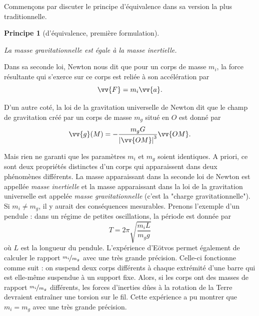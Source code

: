 \documentclass[a4paper,11pt]{report}
\theoremstyle{definition}
\theoremstyle{plain}
\newtheorem{prin}[thm]{Principe}
\theoremstyle{definition}
\theoremstyle{remark}
\begin{document}
            Commençons par discuter le principe d'équivalence dans sa version la plus traditionnelle.
            
            \begin{prin}[d'équivalence, première formulation]
            \begin{leftbar}
                La masse gravitationnelle est égale à la masse inertielle.
            \end{leftbar}
            \end{prin}
            
            Dans sa seconde loi, Newton nous dit que pour un corps de masse $m_i$, la force résultante qui s'exerce sur ce corps est reliée à son accélération par
            \begin{equation}
                \vv{F} = m_i\vv{a}.
            \end{equation}
            
            D'un autre coté, la loi de la gravitation universelle de Newton dit que le champ de gravitation créé par un corps de masse $m_g$ situé en $O$ est donné par
            \begin{equation}
                \vv{g}(M) = -\frac{m_g G}{\abs{\vv{OM}}^3}\vv{OM}.
            \end{equation}
            
            Mais rien ne garanti que les paramètres $m_i$ et $m_g$ soient identiques. A priori, ce sont deux propriétés distinctes d'un corps qui apparaissent dans deux phénomènes différents. La masse apparaissant dans la seconde loi de Newton est appellée \textit{masse inertielle} et la masse apparaissant dans la loi de la gravitation universelle est appelée \textit{masse gravitationnelle} (c'est la "charge gravitationnelle").\\
            
            Si $m_i\neq m_g$, il y aurait des conséquences mesurables. Prenons l'exemple d'un pendule : dans un régime de petites oscillations, la période est donnée par
            \begin{equation}
                T = 2\pi\sqrt{\frac{m_iL}{m_g g}}
            \end{equation}
            où $L$ est la longueur du pendule. L'expérience d'Eötvos permet également de calculer le rapport $\nicefrac{m_i}{m_g}$ avec une très grande précision. Celle-ci fonctionne comme suit : on suspend deux corps différents à chaque extrémité d'une barre qui est elle-même suspendue à un support fixe. Alors, si les corps ont des masses de rapport $\nicefrac{m_{i}}{m_g}$ différents, les forces d'inerties dûes à la rotation de la Terre devraient entraîner une torsion sur le fil. Cette expérience a pu montrer que $m_i = m_g$ avec une très grande précision.\\
            
\end{document}
